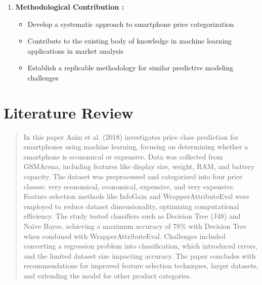 \documentclass[12pt]{report}
\begin{document}
\begin{enumerate}
\begin{itemize}
		\end{itemize}
	\item{\textbf{Methodological Contribution :}}
		\vspace{-1.65em}
		\begin{itemize}
			\setlength\itemsep{-1.5em}
			\item Develop a systematic approach to smartphone price categorization
			\item Contribute to the existing body of knowledge in machine learning applications in market analysis
			\item Establish a replicable methodology for similar predictive modeling challenges
		\end{itemize}
\end{enumerate}

\chapter{Literature Review}
\begin{quotation}
  In this paper Asim et al. \cite{asim2018} (2018) investigates price class prediction for smartphones using machine learning, focusing on determining whether a smartphone is economical or expensive. Data was collected from GSMArena, including features like display size, weight, RAM, and battery capacity. The dataset was preprocessed and categorized into four price classes: very economical, economical, expensive, and very expensive. Feature selection methods like InfoGain and WrapperAttributeEval were employed to reduce dataset dimensionality, optimizing computational efficiency. The study tested classifiers such as Decision Tree (J48) and Naïve Bayes, achieving a maximum accuracy of 78\% with Decision Tree when combined with WrapperAttributeEval. Challenges included converting a regression problem into classification, which introduced errors, and the limited dataset size impacting accuracy. The paper concludes with recommendations for improved feature selection techniques, larger datasets, and extending the model for other product categories.
\end{quotation}
\end{document}
